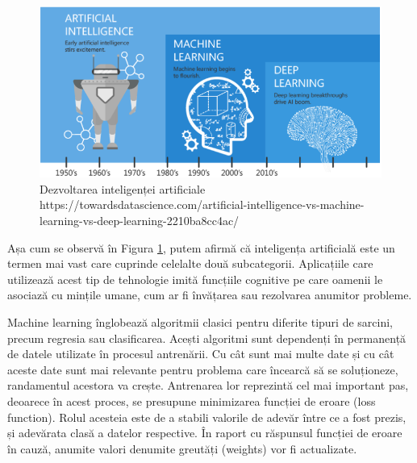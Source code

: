 \documentclass[a4paper, 12pt]{report}
\begin{document}
	\begin{figure}[h]
		\begin{center}
			\includegraphics[scale=0.7]{images/AI_ML_DL.png}
		\end{center}
		\caption{Dezvoltarea inteligenței artificiale\newline
			\hspace{\linewidth}https://towardsdatascience.com/artificial-intelligence-vs-machine-learning-vs-deep-learning-2210ba8cc4ac/}
		\label{fig:AI_ML_DL}
	\end{figure}
	
	Așa cum se observă în Figura \ref{fig:AI_ML_DL}, putem afirmă că inteligența artificială este un termen mai vast care cuprinde celelalte două subcategorii. Aplicațiile care utilizează acest tip de tehnologie imită funcțiile cognitive pe care oamenii le asociază cu mințile umane, cum ar fi învățarea sau rezolvarea anumitor probleme.
	
	Machine learning înglobează algoritmii clasici pentru diferite tipuri de sarcini, precum regresia sau clasificarea. Acești algoritmi sunt dependenți în permanență de datele utilizate în procesul antrenării. Cu cât sunt mai multe date și cu cât aceste date sunt mai relevante pentru problema care încearcă să se soluționeze, randamentul acestora va crește. Antrenarea lor reprezintă cel mai important pas, deoarece în acest proces, se presupune minimizarea funcției de eroare (loss function). Rolul acesteia este de a stabili valorile de adevăr între ce a fost prezis, și adevărata clasă a datelor respective. În raport cu răspunsul funcției de eroare în cauză, anumite valori denumite greutăți (weights) vor fi actualizate.
	
\end{document}
